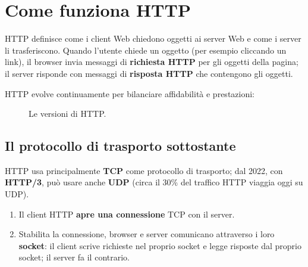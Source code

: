 \section{Come funziona HTTP}

HTTP definisce come i client Web chiedono oggetti ai server Web e come i server li trasferiscono.
Quando l'utente chiede un oggetto (per esempio cliccando un link), il browser invia messaggi di
\textbf{richiesta HTTP} per gli oggetti della pagina; il server risponde con messaggi di
\textbf{risposta HTTP} che contengono gli oggetti.

HTTP evolve continuamente per bilanciare affidabilità e prestazioni:

\begin{figure}[H]
\centering
{}
\caption{Le versioni di HTTP.}
\end{figure}

\subsection{Il protocollo di trasporto sottostante}

HTTP usa principalmente \textbf{TCP} come protocollo di trasporto; dal 2022, con \textbf{HTTP/3}, può
usare anche \textbf{UDP} (circa il 30\% del traffico HTTP viaggia oggi su UDP).

\begin{enumerate}
    \item Il client HTTP \textbf{apre una connessione} TCP con il server.
    \item Stabilita la connessione, browser e server comunicano attraverso i loro \textbf{socket}: il client
          scrive richieste nel proprio socket e legge risposte dal proprio socket; il server fa il contrario.
\end{enumerate}

